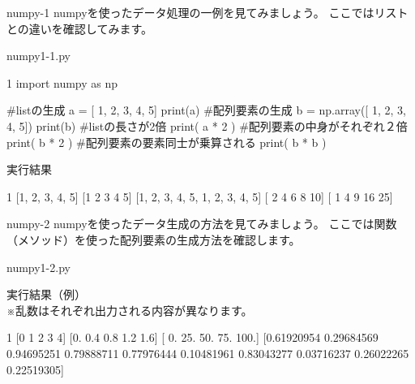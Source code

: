 \begin{pabox}{numpy-1}
numpyを使ったデータ処理の一例を見てみましょう。
ここではリストとの違いを確認してみます。

\begin{legbox}{numpy1-1.py}
\begin{listing}{1}
import numpy as np

#listの生成
a = [ 1, 2, 3, 4, 5]
print(a)
#配列要素の生成
b = np.array([ 1, 2, 3, 4, 5])
print(b)
#listの長さが2倍
print( a * 2 )
#配列要素の中身がそれぞれ２倍
print( b * 2 )
#配列要素の要素同士が乗算される
print( b * b )
\end{listing}

実行結果\\
\begin{listing}{1}
[1, 2, 3, 4, 5]
[1 2 3 4 5]
[1, 2, 3, 4, 5, 1, 2, 3, 4, 5]
[ 2  4  6  8 10]
[ 1  4  9 16 25]
\end{listing}
\end{legbox}

\end{pabox}

\begin{pabox}{numpy-2}
numpyを使ったデータ生成の方法を見てみましょう。
ここでは関数（メソッド）を使った配列要素の生成方法を確認します。

\begin{legbox}{numpy1-2.py}

実行結果（例）\\
※乱数はそれぞれ出力される内容が異なります。\\
\begin{listing}{1}
[0 1 2 3 4]
[0.  0.4 0.8 1.2 1.6]
[  0.  25.  50.  75. 100.]
[0.61920954 0.29684569 0.94695251 0.79888711 0.77976444 0.10481961
 0.83043277 0.03716237 0.26022265 0.22519305]
\end{listing}
\end{legbox}

\end{pabox}



